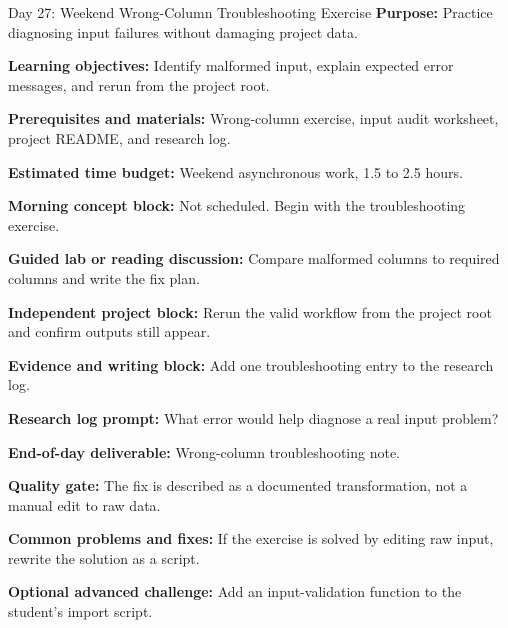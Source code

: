 \begin{dailybox}{Day 27: Weekend Wrong-Column Troubleshooting Exercise}
\textbf{Purpose:} Practice diagnosing input failures without damaging project data.

\textbf{Learning objectives:} Identify malformed input, explain expected error messages, and rerun from the project root.

\textbf{Prerequisites and materials:} Wrong-column exercise, input audit worksheet, project README, and research log.

\textbf{Estimated time budget:} Weekend asynchronous work, 1.5 to 2.5 hours.

\textbf{Morning concept block:} Not scheduled. Begin with the troubleshooting exercise.

\textbf{Guided lab or reading discussion:} Compare malformed columns to required columns and write the fix plan.

\textbf{Independent project block:} Rerun the valid workflow from the project root and confirm outputs still appear.

\textbf{Evidence and writing block:} Add one troubleshooting entry to the research log.

\textbf{Research log prompt:} What error would help diagnose a real input problem?

\textbf{End-of-day deliverable:} Wrong-column troubleshooting note.

\textbf{Quality gate:} The fix is described as a documented transformation, not a manual edit to raw data.

\textbf{Common problems and fixes:} If the exercise is solved by editing raw input, rewrite the solution as a script.

\textbf{Optional advanced challenge:} Add an input-validation function to the student's import script.
\end{dailybox}

